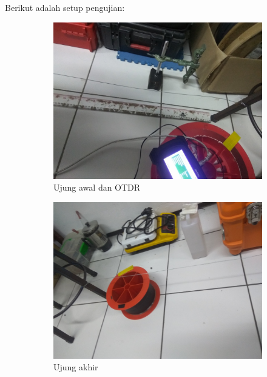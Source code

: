\documentclass[12pt]{article}
\begin{document}
	Berikut adalah setup pengujian:
	
	\begin{figure}[h!]
		\centering
		\captionsetup{justification=centering}
		\begin{subfigure}[b]{0.3\textwidth}
			\includegraphics[width=\textwidth]{images/Bab_4/Bab_4_5a}	
			\caption{\small{Ujung awal dan OTDR}}		
		\end{subfigure}
		\begin{subfigure}[b]{0.3\textwidth}
			\includegraphics[width=\linewidth]{images/Bab_4/Bab_4_5b}
			\caption{\small{Ujung akhir}}			
		\end{subfigure}
		\begin{subfigure}[b]{0.4\textwidth}

\end{subfigure}
\end{figure}
\end{document}
